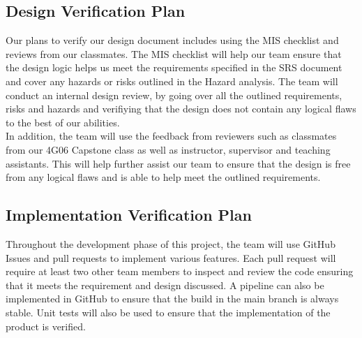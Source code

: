 \documentclass[12pt, titlepage]{article}
\begin{document}
\subsection{Design Verification Plan}

Our plans to verify our design document includes using the MIS checklist and reviews from our classmates. 
The MIS checklist will help our team ensure that the design logic helps us meet the requirements specified in 
the SRS document and cover any hazards or risks outlined in the Hazard analysis. The team will conduct an internal 
design review, by going over all the outlined requirements, risks and hazards and verifiying that the design does not
contain any logical flaws to the best of our abilities. \\

\noindent  In addition, the team will use the feedback from reviewers such as classmates from our 4G06 Capstone class as well
as instructor, supervisor and teaching assistants. This will help further assist our team to ensure that the design is free from 
any logical flaws and is able to help meet the outlined requirements. 




\subsection{Implementation Verification Plan}


Throughout the development phase of this project, the team will use GitHub Issues and pull requests to implement
various features. Each pull request will require at least two other team members to inspect and review the code 
ensuring that it meets the requirement and design discussed. A pipeline can also be implemented in GitHub to ensure that
the build in the main branch is always stable. Unit tests will also be used to ensure that the implementation of the product
is verified. 


\end{document}
